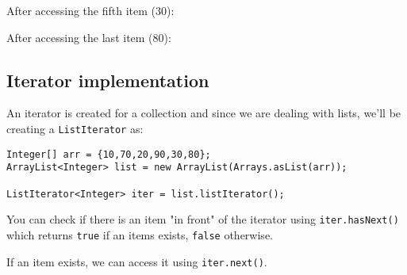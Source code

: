 \vskip 1mm

After accessing the fifth item (30):
\vskip 1mm

\bgroup \tikzset{png export}  \egroup

\vskip 1mm
				
After accessing the last item (80):
\vskip 1mm

\bgroup \tikzset{png export}  \egroup

\newpage

\subsection{Iterator implementation}

An iterator is created for a collection and since we are dealing with lists, we'll be creating a \texttt{ListIterator} as:

\begin{lstlisting}
Integer[] arr = {10,70,20,90,30,80};
ArrayList<Integer> list = new ArrayList(Arrays.asList(arr));

ListIterator<Integer> iter = list.listIterator();
\end{lstlisting}

You can check if there is an item "in front" of the iterator using \texttt{iter.hasNext()} which returns \texttt{true} if an items exists, \texttt{false} otherwise.

If an item exists, we can access it using \texttt{iter.next()}.

